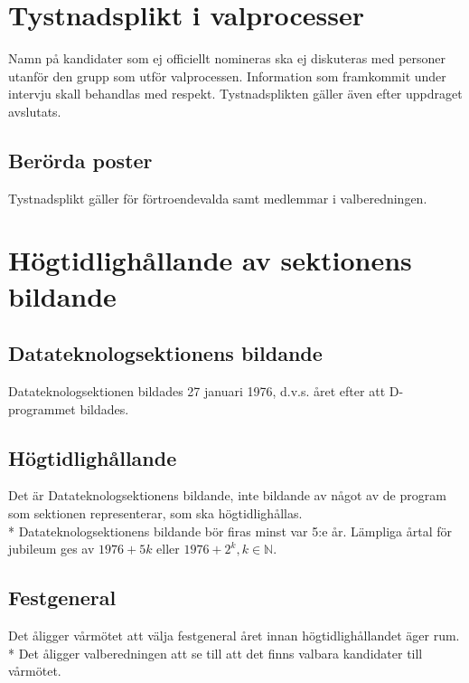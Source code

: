 \documentclass{datateknologsektionen-document}
\begin{document}
\section{Tystnadsplikt i valprocesser}
Namn på kandidater som ej officiellt nomineras ska ej diskuteras med personer utanför den grupp
som utför valprocessen. Information som framkommit under intervju skall behandlas med respekt.
Tystnadsplikten gäller även efter uppdraget avslutats.
\subsection{Berörda poster}
Tystnadsplikt gäller för förtroendevalda samt medlemmar i valberedningen.
\section{Högtidlighållande av sektionens bildande}
\subsection{Datateknologsektionens bildande}
Datateknologsektionen bildades 27 januari 1976, d.v.s. året efter att D-programmet bildades.

\subsection{Högtidlighållande}
Det är Datateknologsektionens bildande, inte bildande av något av de program som sektionen representerar, som ska högtidlighållas.\\*
Datateknologsektionens bildande bör firas minst var 5:e år. Lämpliga årtal för jubileum ges av \(1976
+ 5k\) eller \(1976 + 2^k, k \in \mathbb{N}\).
\subsection{Festgeneral}
\label{hogtid}
Det åligger vårmötet att välja festgeneral året innan högtidlighållandet äger rum.\\*
Det åligger valberedningen att se till att det finns valbara kandidater till vårmötet.
\end{document}
